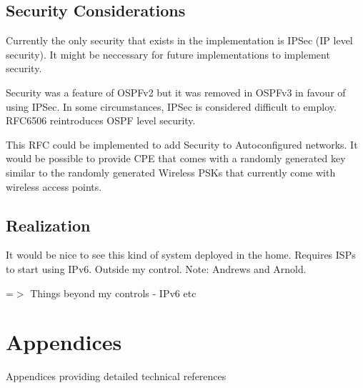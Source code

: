 \documentclass[12pt]{report}
\begin{document}
\section{Security Considerations}
Currently the only security that exists in the implementation is IPSec (IP level security). It might be neccessary for future implementations to implement security.

Security was a feature of OSPFv2 but it was removed in OSPFv3 in favour of using 
IPSec. In some circumstances, IPSec is considered difficult to employ. RFC6506 
reintroduces OSPF level security. 

This RFC could be implemented to add Security to Autoconfigured networks. It would 
be possible to provide CPE that comes with a randomly generated key similar to the 
randomly generated Wireless PSKs that currently come with wireless access points.

\section{Realization}
It would be nice to see this kind of system deployed in the home. 
Requires ISPs to start using IPv6.
Outside my control. 
Note: Andrews and Arnold.

=$>$ Things beyond my controls - IPv6 etc

\pagebreak

\printnomenclature

\pagebreak

{}


\appendix 

\chapter{Appendices}
Appendices providing detailed technical references
\end{document}
